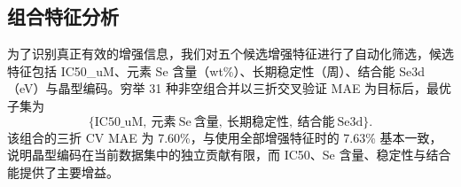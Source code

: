 \subsection{组合特征分析}
为了识别真正有效的增强信息，我们对五个候选增强特征进行了自动化筛选，候选特征包括 IC50\_uM、元素 Se 含量（wt\%）、长期稳定性（周）、结合能 Se3d（eV）与晶型编码。穷举 31 种非空组合并以三折交叉验证 MAE 为目标后，最优子集为
\[
\{\mathrm{IC50\_uM},\ \mathrm{元素\ Se\ 含量},\ \mathrm{长期稳定性},\ \mathrm{结合能\ Se3d}\}.
\]
该组合的三折 CV MAE 为 7.60\%，与使用全部增强特征时的 7.63\% 基本一致，说明晶型编码在当前数据集中的独立贡献有限，而 IC50、Se 含量、稳定性与结合能提供了主要增益。
